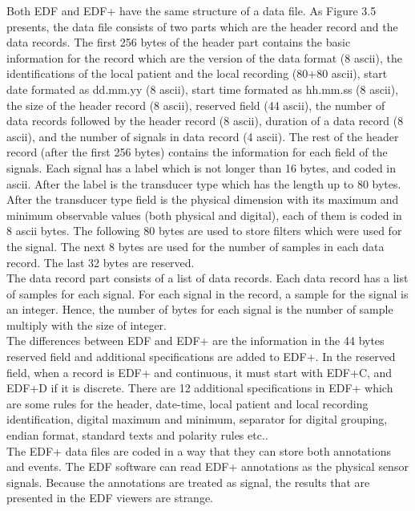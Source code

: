         Both EDF and EDF+ have the same structure of a data file. As Figure 3.5 presents, the data file consists of two parts which are the header record and the data records. The first 256 bytes of the header part contains the basic information for the record which are the version of the data format (8 ascii), the identifications of the local patient and the local recording (80+80 ascii), start date formated as dd.mm.yy (8 ascii), start time formated as hh.mm.ss (8 ascii), the size of the header record (8 ascii), reserved field (44 ascii), the number of data records followed by the header record (8 ascii), duration of a data record (8 ascii), and the number of signals in data record (4 ascii). The rest of the header record (after the first 256 bytes) contains the information for each field of the signals. Each signal has a label which is not longer than 16 bytes, and coded in ascii. After the label is the transducer type which has the length up to 80 bytes. After the transducer type field is the physical dimension with its maximum and minimum observable values (both physical and digital), each of them is coded in 8 ascii bytes. The following 80 bytes are used to store filters which were used for the signal. The next 8 bytes are used for the number of samples in each data record. The last 32 bytes are reserved.\\
        The data record part consists of a list of data records. Each data record has a list of samples for each signal. For each signal in the record, a sample for the signal is an integer. Hence, the number of bytes for each signal is the number of sample multiply with the size of integer.\\
        The differences between EDF and EDF+ are the information in the 44 bytes reserved field and additional specifications are added to EDF+. In the reserved field, when a record is EDF+ and continuous, it must start with EDF+C, and EDF+D if it is discrete. There are 12 additional specifications in EDF+ which are some rules for the header, date-time, local patient and local recording identification, digital maximum and minimum, separator for digital grouping, endian format, standard texts and polarity rules etc.\cite{EDFpluss}.\\
        The EDF+ data files are coded in a way that they can store both annotations and events. The EDF software can read EDF+ annotations as the physical sensor signals. Because the annotations are treated as signal, the results that are presented in the EDF viewers are strange.\\
